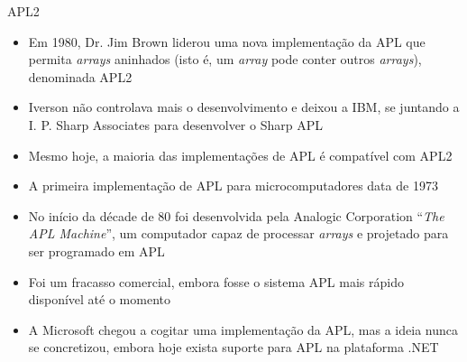 \begin{frame}[fragile]{APL2}

    \begin{itemize}
        \item Em 1980, Dr. Jim Brown liderou uma nova implementação da APL que permita \textit{arrays} aninhados (isto é, um \textit{array} pode conter outros \textit{arrays}), denominada APL2

        \pause
        \item Iverson não controlava mais o desenvolvimento e deixou a IBM, se juntando a I. P. Sharp Associates para desenvolver o Sharp APL
        \pause

        \item Mesmo hoje, a maioria das implementações de APL é compatível com APL2
        \pause

        \item A primeira implementação de APL para microcomputadores data de 1973
        \pause

        \item No início da décade de 80 foi desenvolvida pela Analogic Corporation ``\textit{The APL Machine}'', um computador capaz de processar \textit{arrays} e projetado para ser programado em APL
        \pause

        \item  Foi um fracasso comercial, embora fosse o sistema APL mais rápido disponível até o momento
        \pause
        \item A Microsoft chegou a cogitar uma implementação da APL, mas a ideia nunca se concretizou, embora hoje exista suporte para APL na plataforma .NET
    \end{itemize}

\end{frame}

